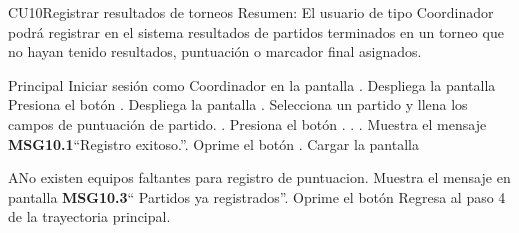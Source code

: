 
	\begin{UseCase}{CU10}{Registrar resultados de torneos}{
		Resumen: El usuario de tipo Coordinador podrá registrar en el sistema resultados de partidos terminados en un torneo que no hayan tenido resultados, puntuación o marcador final asignados.}
	\end{UseCase}
	\newpage
\begin{UCtrayectoria}{Principal}
	\UCpaso[\UCactor] Iniciar sesión como Coordinador en la pantalla .
	\UCpaso Despliega la pantalla 
	\UCpaso[\UCactor] Presiona el botón .
	\UCpaso Despliega la pantalla  .
    \UCpaso[\UCactor] Selecciona un partido y llena los campos de puntuación de partido. .
    \UCpaso[\UCactor] Presiona el botón . . .
	\UCpaso Muestra el mensaje {\bf MSG10.1}``Registro exitoso.''.
	\UCpaso[\UCactor] Oprime el botón .
	\UCpaso Cargar la pantalla 
\end{UCtrayectoria}

	\begin{UCtrayectoriaA}{A}{No existen equipos faltantes para registro de puntuacion.}
		\UCpaso Muestra el mensaje en pantalla {\bf MSG10.3}`` Partidos ya registrados''.
		\UCpaso[\UCactor] Oprime el botón 
		\UCpaso[] Regresa al paso 4 de la trayectoria principal.
	\end{UCtrayectoriaA}
	
